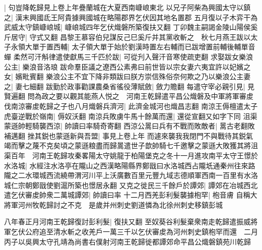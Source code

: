 |{
	句豈降乾歸見上卷上年疊蘭城在大夏西南嵻㟍東北}
以兄子阿柴為興國太守以鎮之|{
	漢末興國氐王阿貴據興國城在略陽郡界乞伏因其地名置郡}
五月復以子木弈干為武威太守鎮嵻㟍城|{
	嵻㟍城四年乞伏熾磐所築復扶又翻}
丁卯魏主嗣謁金陵山陽侯奚斤居守|{
	守式又翻}
昌黎王慕容伯兒謀反己巳奚斤并其黨收斬之　秋七月燕王跋以太子永領大單于置西輔|{
	太子領大單于始於劉漢時置左右輔而已跋增置前輔後輔單音蟬}
柔然可汗斛律遣使獻馬三千匹於跋|{
	可從刋入聲汗音寒使疏吏翻}
求娶跋女樂浪公主|{
	樂浪音洛琅}
跋命羣臣議之遼西公素弗曰前世皆以宗女妻六夷宜許以妃嬪之女|{
	嬪毗賓翻}
樂浪公主不宜下降非類跋曰朕方崇信殊俗奈何欺之乃以樂浪公主妻之|{
	妻七細翻}
跋勤於政事勸課農桑省徭役薄賦斂|{
	斂力贍翻}
每遣守宰必親引見|{
	見賢遍翻}
問為政之要以觀其能燕人悦之　河南王乾歸遣平昌公熾磐及中軍將軍審䖍伐南涼審䖍乾歸之子也八月熾磐兵濟河|{
	此濟金城河也熾昌志翻}
南涼王傉檀遣太子虎臺逆戰於嶺南|{
	傉奴沃翻}
南涼兵敗虜牛馬十餘萬而還|{
	還從宣翻又如字下同}
沮渠蒙遜帥輕騎襲西涼|{
	帥讀曰率騎奇寄翻}
西涼公暠曰兵有不戰而敗敵者|{
	暠古老翻敗補邁翻}
挫其鋭也蒙遜新與吾盟|{
	事見上卷上年}
而遽來襲我我閉門不與戰待其鋭氣竭而擊之蔑不克矣頃之蒙遜粮盡而歸暠遣世子歆帥騎七千邀擊之蒙遜大敗獲其將沮渠百年　河南王乾歸攻秦畧陽太守姚龍于柏陽堡克之冬十一月進攻南平太守王憬於水洛城|{
	水經注水洛亭在隴山之西漢略陽縣界鄭戩曰水洛城西占隴坁通秦州往來路隴之二水環城西流繞帶渭河川平上沃廣數百里元豐九域志德順軍西南一百里有水洛城仁宗朝鄭戩使劉滬所築也憬居永翻}
又克之徙民三千餘戶於譚郊|{
	譚郊在冶城西北}
遣乞伏審䖍帥衆二萬城譚郊|{
	帥讀曰率}
十二月西羌彭利髮襲據枹罕|{
	枹音膚}
自稱大將軍河州牧乾歸討之不克　是歲并州刺史劉道憐為北徐州刺史移鎮彭城

八年春正月河南王乾歸復討彭利髮|{
	復扶又翻}
至奴葵谷利髮棄衆南走乾歸遣振威將軍乞伏公府追至清水斬之收羌戶一萬三千以乞伏審䖍為河州刺史鎮枹罕而還　二月丙子以吳興太守孔靖為尚書右僕射河南王乾歸徙都譚郊命平昌公熾磐鎮苑川乾歸

